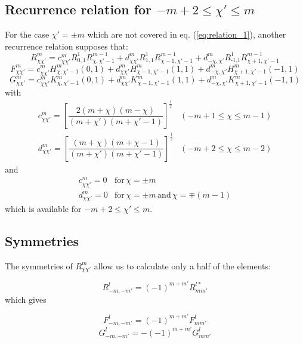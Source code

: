 \subsection{Recurrence relation for $-m+2\leq\chi'\leq m$}

For the case $\chi'=\pm m$ which are not covered in eq. (\ref{eq:relation_1}),
another recurrence relation supposes that:
\begin{equation}
R_{\chi\chi'}^{m}=c_{\chi\chi'}^{m}R_{0,1}^{1}R_{\chi,\chi'-1}^{m-1}+d_{\chi\chi'}^{m}R_{1,1}^{1}R_{\chi-1,\chi'-1}^{m-1}+d_{-\chi,\chi'}^{m}R_{\text{-1,}1}^{1}R_{\chi+1,\chi'-1}^{m-1}
\end{equation}
\begin{equation}
F_{\chi\chi'}^{m}=c_{\chi\chi'}^{m}H_{\chi,\chi'-1}^{m}(0,1)+d_{\chi\chi'}^{m}H_{\chi-1,\chi'-1}^{m}(1,1)+d_{-\chi,\chi'}^{m}H_{\chi+1,\chi'-1}^{m}(-1,1)
\end{equation}
\begin{equation}
G_{\chi\chi'}^{m}=c_{\chi\chi'}^{m}K_{\chi,\chi'-1}^{m}(0,1)+d_{\chi\chi'}^{m}K_{\chi-1,\chi'-1}^{m}(1,1)+d_{-\chi,\chi'}^{m}K_{\chi+1,\chi'-1}^{m}(-1,1)
\end{equation}
with
\begin{equation}
\begin{array}{ll}
c_{\chi\chi'}^{m}=\left[\dfrac{2\left(m+\chi\right)\left(m-\chi\right)}{\left(m+\chi'\right)\left(m+\chi'-1\right)}\right]^{\frac{1}{2}} & (-m+1\leq\chi\leq m-1)\\
d_{\chi\chi'}^{m}=\left[\dfrac{\left(m+\chi\right)\left(m+\chi-1\right)}{\left(m+\chi'\right)\left(m+\chi'-1\right)}\right]^{\frac{1}{2}} & (-m+2\leq\chi\leq m-2)
\end{array}
\end{equation}
and
\begin{equation}
\begin{array}{ll}
c_{\chi\chi'}^{m}=0 & \mathrm{for}\,\chi=\pm m\\
d_{\chi\chi'}^{m}=0 & \mathrm{for}\,\chi=\pm m\,\mathrm{and}\,\chi=\mp(m-1)
\end{array}
\end{equation}
which is available for $-m+2\leq\chi'\leq m$.

\subsection{Symmetries}

The symmetries of $R_{\chi\chi'}^{m}$ allow us to calculate only
a half of the elements: 

\begin{equation}
R_{-m,-m'}^{l}=\left(-1\right)^{m+m'}R_{mm'}^{l*}
\end{equation}
which gives

\begin{equation}
F_{-m,-m'}^{l}=\left(-1\right)^{m+m'}F_{mm'}^{l}
\end{equation}
\begin{equation}
G_{-m,-m'}^{l}=-\left(-1\right)^{m+m'}G_{mm'}^{l}
\end{equation}


